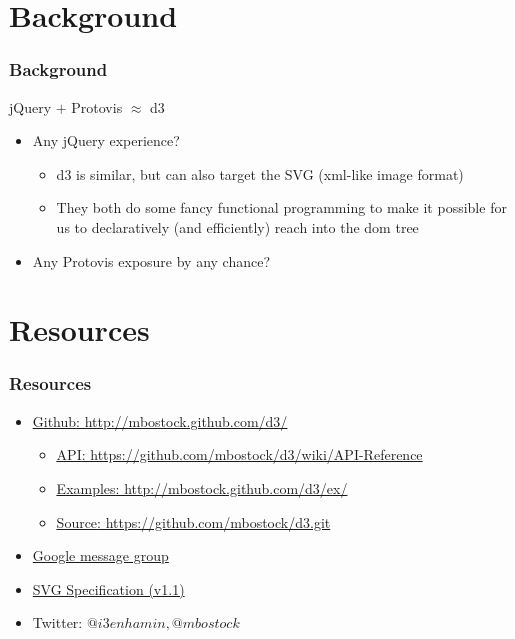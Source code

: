 \documentclass{beamer}
\begin{document}
\section{Background}

\begin{frame}
    \frametitle{Background}
    \begin{block}{jQuery $+$ Protovis $\approx$ d3}
\pause
        \begin{itemize}
        \item Any jQuery experience?
\pause
            \begin{itemize}
            \item d3 is similar, but can also target the SVG (xml-like image format)
\pause
            \item They both do some fancy functional programming to make it possible 
                  for us to declaratively (and efficiently) reach into the dom tree
            \end{itemize}
\pause
       \item Any Protovis exposure by any chance?
       \end{itemize}
    \end{block}
\end{frame}


\section{Resources}

\begin{frame}
    \frametitle{Resources}
\pause
        \begin{itemize}
        \item \href{http://mbostock.github.com/d3/}{\underline{Github}: http://mbostock.github.com/d3/}
\pause
            \begin{itemize}
            \item \href{https://github.com/mbostock/d3/wiki/API-Reference}{\underline{API}: https://github.com/mbostock/d3/wiki/API-Reference}
\pause
            \item \href{http://mbostock.github.com/d3/ex/}{\underline{Examples}: http://mbostock.github.com/d3/ex/}
\pause
            \item \href{https://github.com/mbostock/d3.git}{\underline{Source}: https://github.com/mbostock/d3.git}
            \end{itemize}
\pause
        \item \href{http://groups.google.com/group/d3-js?pli=1}{Google message group}
\pause
        \item \href{http://www.w3.org/TR/SVG/}{SVG Specification (v1.1)}
\pause
        \item Twitter: $@i3enhamin, @mbostock$
        \end{itemize}
\end{frame}
\end{document}
